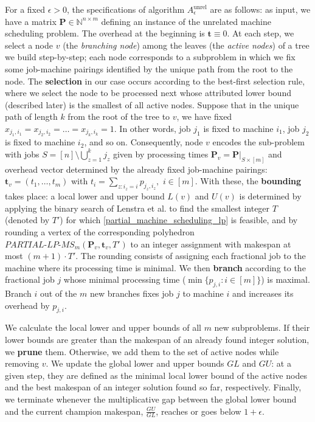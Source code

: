 \documentclass[a4paper,UKenglish,cleveref, autoref, thm-restate, pdfa]{lipics-v2021}
\newcommand{\N}{\mathbb{N}}
\theoremstyle{plain}
\begin{document}
For a fixed $\epsilon > 0$, the specifications of algorithm $A^{\text{unrel}}_{\epsilon}$ are as follows: as input, we have a matrix $\bm{P} \in \N^{n \times m}$ defining an instance of the unrelated machine scheduling problem. The overhead at the beginning is $\bm{t}\equiv 0$. At each step, we select a node $v$ (the \emph{branching node}) among the leaves (the \emph{active nodes}) of a tree we build step-by-step; each node corresponds to a subproblem in which we fix some job-machine pairings identified by the unique path from the root to the node. The \textbf{selection} in our case occurs according to the best-first selection rule, where we select the node to be processed next whose attributed lower bound (described later) is the smallest of all active nodes. Suppose that in the unique path of length $k$ from the root of the tree to $v$, we have fixed $x_{j_1, i_1} = x_{j_2, i_2} = \ldots = x_{j_k, i_k} = 1$. In other words, job $j_1$ is fixed to machine $i_1$, job $j_2$ is fixed to machine $i_2$, and so on. Consequently, node $v$ encodes the sub-problem with jobs $S=[n]\setminus \bigcup_{z=1}^k j_z$ given by processing times $\bm{P}_v=\bm{P}|_{S \times [m]}$ and overhead vector determined by the already fixed job-machine pairings: $\bm{t}_v= (t_1, \ldots, t_m)$ with $t_i= \sum\limits_{z: i_z = i} p_{j_z, i_z}, \,\, i \in [m]$. With these, the \textbf{bounding} takes place: a local lower and upper bound $L(v)$ and $U(v)$ is determined by applying the binary search of Lenstra et al. to find the smallest integer $T$ (denoted by $T'$) for which \eqref{partial_machine_scheduling_lp} is feasible, and by rounding a vertex of the corresponding polyhedron $PARTIAL\text{-}LP\text{-}MS_m(\bm{P}_v, \bm{t}_v, T')$ to an integer assignment with makespan at most $(m+1)\cdot T'$. The rounding consists of assigning each fractional job to the machine where its processing time is minimal. We then \textbf{branch} according to the fractional job $j$ whose minimal processing time ($\min\{p_{j,i}: i\in [m]\}$) is maximal. Branch $i$ out of the $m$ new branches fixes job $j$ to machine $i$ and increases its overhead by $p_{j, i}$. 

We calculate the local lower and upper bounds of all $m$ new subproblems. If their lower bounds are greater than the makespan of an already found integer solution, we \textbf{prune} them. Otherwise, we add them to the set of active nodes while removing $v$. We update the global lower and upper bounds $GL$ and $GU$: at a given step, they are defined as the minimal local lower bound of the active nodes and the best makespan of an integer solution found so far, respectively. Finally, we terminate whenever the multiplicative gap between the global lower bound and the current champion makespan, $\frac{GU}{GL}$, reaches or goes below $1+\epsilon$.
\end{document}
